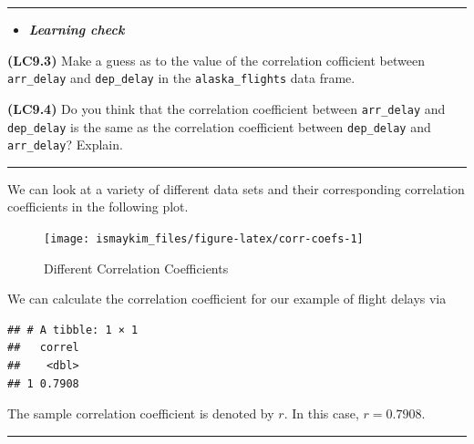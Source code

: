 \documentclass[]{tufte-book}
\newenvironment{Shaded}{\begin{snugshade}}{\end{snugshade}}
\newcommand{\KeywordTok}[1]{\textcolor[rgb]{0.13,0.29,0.53}{\textbf{{#1}}}}
\newcommand{\DataTypeTok}[1]{\textcolor[rgb]{0.13,0.29,0.53}{{#1}}}
\newcommand{\StringTok}[1]{\textcolor[rgb]{0.31,0.60,0.02}{{#1}}}
\newcommand{\NormalTok}[1]{{#1}}
\let\oldrule=\rule
\renewcommand{\rule}[1]{\oldrule{\linewidth}}
\newenvironment{rmdblock}[1]
  {\begin{shaded*}
  \begin{itemize}
  \renewcommand{\labelitemi}{
    \raisebox{-.7\height}[0pt][0pt]{
    }
  }
  \item
  }
  {
  \end{itemize}
  \end{shaded*}
  }
\newenvironment{learncheck}
  {\begin{rmdblock}{warning}}
  {\end{rmdblock}}
\theoremstyle{definition}
\theoremstyle{definition}
\theoremstyle{remark}
\begin{document}
\begin{center}\rule{0.5\linewidth}{\linethickness}\end{center}

\begin{learncheck}
\textbf{\emph{Learning check}}
\end{learncheck}

\textbf{(LC9.3)} Make a guess as to the value of the correlation
cofficient between \texttt{arr\_delay} and \texttt{dep\_delay} in the
\texttt{alaska\_flights} data frame.

\textbf{(LC9.4)} Do you think that the correlation coefficient between
\texttt{arr\_delay} and \texttt{dep\_delay} is the same as the
correlation coefficient between \texttt{dep\_delay} and
\texttt{arr\_delay}? Explain.

\begin{center}\rule{0.5\linewidth}{\linethickness}\end{center}

We can look at a variety of different data sets and their corresponding
correlation coefficients in the following plot.

\begin{figure}

{\centering \texttt{[image: ismaykim\_files/figure-latex/corr-coefs-1]} 

}

\caption[Different Correlation Coefficients]{Different Correlation Coefficients}\label{fig:corr-coefs}
\end{figure}

We can calculate the correlation coefficient for our example of flight
delays via

\begin{Shaded}
\end{Shaded}

\begin{verbatim}
## # A tibble: 1 × 1
##   correl
##    <dbl>
## 1 0.7908
\end{verbatim}

The sample correlation coefficient is denoted by \(r\). In this case,
\(r = 0.7908\).

\begin{center}\rule{0.5\linewidth}{\linethickness}\end{center}
\end{document}
